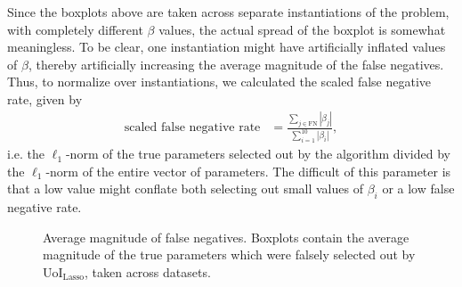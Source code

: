 \documentclass[11pt]{article}
\begin{document}
Since the boxplots above are taken across separate instantiations of the problem, with completely different $\beta$ values, the actual spread of the boxplot is somewhat meaningless. To be clear, one instantiation might have artificially inflated values of $\beta$, thereby artificially increasing the average magnitude of the false negatives. Thus, to normalize over instantiations, we calculated the scaled false negative rate, given by
\begin{align}
	\text{scaled false negative rate} &= \frac{\sum_{j \in \text{FN}} |\beta_j|}{\sum_{i=1}^{10} |\beta_i|},
\end{align}
i.e. the $\ell_1$-norm of the true parameters selected out by the algorithm divided by the $\ell_1$-norm of the entire vector of parameters. The difficult of this parameter is that a low value might conflate both selecting out small values of $\beta_i$ or a low false negative rate.

\begin{figure}[H]
	\centering
	\caption{Average magnitude of false negatives. Boxplots contain the average magnitude of the true parameters which were falsely selected out by UoI$_{\text{Lasso}}$, taken across datasets. }
	\label{fig:exp2-mag-fn}
\end{figure}
\end{document}
